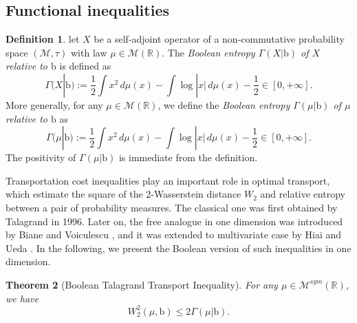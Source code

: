 \documentclass[10pt, reqno]{amsart}
\numberwithin{equation}{section}
\theoremstyle{definition}
\newtheorem{definition}{Definition}[section]
\theoremstyle{plain}
\newtheorem{theorem}[definition]{Theorem}
\theoremstyle{remark}
\newcommand{\R}{\mathbb{R}}
\newcommand{\1}{\mathbbm{1}}
\newcommand{\probmr}{\mathcal{M}(\R)}
\begin{document}
\subsection{Functional inequalities}\label{Sec3:booleanentropy}
\begin{definition}
let $X$ be a self-adjoint operator of a non-commutative probability space $(\mathcal{M},\tau)$ with law $\mu\in\probmr$. The \textit{Boolean entropy $\Gamma(X|\mathbb{\mathrm{b}})$ of $X$ relative to $\mathbb{\mathrm{b}}$}  is defined as
\begin{equation}\label{def:rela entropy}
		\Gamma(X|\mathbb{\mathrm{b}}):=\frac{1}{2}\int x^2 \,d\mu(x)  -\int \log |x|\,d\mu(x)-\frac{1}{2}\in [0,+\infty].
	\end{equation}
    More generally, for any $\mu \in\probmr$, we define the \textit{Boolean entropy $\Gamma(\mu|\mathbb{\mathrm{b}})$ of $\mu$ relative to $\mathbb{\mathrm{b}}$}   as
\begin{equation*}
		\Gamma(\mu|\mathbb{\mathrm{b}}):=\frac{1}{2}\int x^2 \,d\mu(x)  -\int \log |x|\,d\mu(x)-\frac{1}{2}\in [0,+\infty].
	\end{equation*}
    The positivity of $\Gamma(\mu|\mathbb{\mathrm{b}})$ is immediate from the definition.
\end{definition}
    Transportation cost inequalities play an important role in optimal transport, which estimate the square of the 2-Wasserstein distance $W_2$ and relative entropy between a pair of probability measures. The classical one was first obtained by Talagrand \cite{talagrand1996transportation} in 1996. Later on, the free analogue in one dimension was introduced by Biane and Voiculescu \cite{bianevoi2001free}, and it was extended to multivariate case by Hiai and Ueda \cite{hiai2006free}. In the following, we present the Boolean version of such inequalities in one dimension.
	\begin{theorem}[Boolean Talagrand Transport Inequality]\label{thm:TTI}
		For any $\mu\in\mathcal{M}^{sym}(\R)$, we have
		\begin{equation}\label{ineq:TTI}
		    W_2^2(\mu,\mathbb{\mathrm{b}})\leq 2\Gamma(\mu|\mathbb{\mathrm{b}}).
	    \end{equation}
	\end{theorem}
\end{document}
